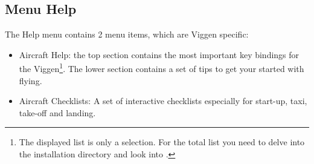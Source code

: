 \documentclass[a4paper]{report}
\begin{document}
\subsection{Menu Help}
The Help menu contains 2 menu items, which are Viggen specific:
\begin{itemize}
\item Aircraft Help: the top section contains the most important key bindings for the Viggen\footnote{The displayed list is only a selection. For the total list you need to delve into the installation directory and look into .}. The lower section contains a set of tips to get your started with flying.
\item Aircraft Checklists: A set of interactive checklists especially for start-up, taxi, take-off and landing.
\end{itemize}
\end{document}
